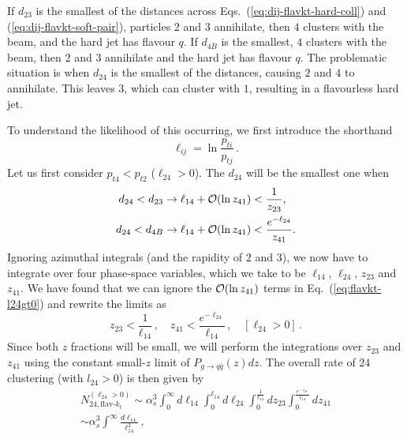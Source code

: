 \documentclass[nofootinbib,twocolumn,preprintnumbers,superscriptaddress,aps]{revtex4-2}
\newcommand{\as}{\alpha_s}
\newcommand{\order}[1]{{\cal O}\!\left(#1\right)}
\begin{document}
If $d_{23}$ is the smallest of the distances across
Eqs.~(\ref{eq:dij-flavkt-hard-coll}) and
(\ref{eq:dij-flavkt-soft-pair}), particles $2$ and $3$ annihilate,
then $4$ clusters with the beam, and the hard jet has flavour $q$.
%
If $d_{4B}$ is the smallest, $4$ clusters with the beam, then $2$ and
$3$ annihilate and the hard jet has flavour $q$.
%
The problematic situation is when $d_{24}$ is the smallest of the
distances, causing $2$ and $4$ to annihilate.
%
This leaves $3$, which can cluster with $1$, resulting in a
flavourless hard jet.


To understand the likelihood of this occurring,
%
we first introduce the shorthand
\begin{equation}
  \label{eq:ell-shorthands}
  \ell_{ij} = \ln \frac{p_{ti}}{p_{tj}}\,.
\end{equation}
%
Let us first consider $p_{t4} < p_{t2}$ ($\ell_{24}>0$).
%
The $d_{24}$ will be the smallest one when
\begin{subequations}
  \label{eq:flavkt-l24gt0}
  \begin{align}
    d_{24} < d_{23} &\to \ell_{14} + \order{\ln z_{41}} < \frac1{z_{23}},
    \\
    d_{24} < d_{4B} &\to \ell_{14} + \order{\ln z_{41}} < \frac{e^{-\ell_{24}}}{z_{41}}.
  \end{align}
\end{subequations}
Ignoring azimuthal integrals (and the rapidity of $2$ and $3$), we now
have to integrate over four phase-space variables, which we take to be
$\ell_{14}$, $\ell_{24}$, $z_{23}$ and $z_{41}$.
%
We have found that we can ignore the $\order{\ln z_{41}}$ terms in
Eq.~(\ref{eq:flavkt-l24gt0}) and rewrite the limits as 
\begin{equation}
  z_{23} < \frac{1}{\ell_{14}}\,,
  \quad
  z_{41} < \frac{e^{-\ell_{24}}}{\ell_{14}}\,,
  \quad
  [\ell_{24} > 0] \,.
\end{equation}
%
Since both $z$ fractions will be small, we will perform the
integrations over $z_{23}$ and $z_{41}$ using the constant small-$z$ limit of
$P_{g\to q\bar q}(z)dz$.
%
The overall rate of $24$ clustering (with $l_{24}>0$) is then given by
\begin{multline}
  \label{eq:N24-flavkt-a}
  N_{24,\text{flav-}k_t}^{(\ell_{24}>0)}
  \sim \as^3
  \int_0^\infty \!\! d\ell_{14}
  \int_0^{\ell_{14}} \!\! d\ell_{24}
  \int_0^{\frac{1}{\ell_{14}}} \!\! dz_{23}
  \int_0^{\frac{e^{-\ell_{24}}}{\ell_{14}}} \!\! dz_{41}
  \\
  \sim \as^3 \int^\infty \frac{d\ell_{14}}{\ell_{14}^2}\,,
\end{multline}
\end{document}
